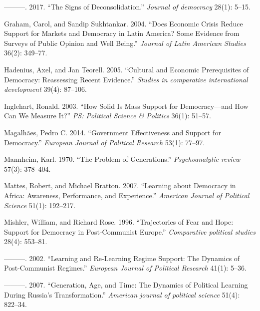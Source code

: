 \documentclass[12pt,english,a4paper,oneside]{article}
\newlength{\cslhangindent}
\newlength{\cslentryspacingunit} %
\newenvironment{CSLReferences}[2] %
 {%
  \setlength{\parindent}{0pt}
  \ifodd #1
  \let\oldpar\par
  \def\par{\hangindent=\cslhangindent\oldpar}
  \fi
  \setlength{\parskip}{#2\cslentryspacingunit}
 }%
 {}
\theoremstyle{definition}
\theoremstyle{definition}
\theoremstyle{definition}
\theoremstyle{definition}
\theoremstyle{remark}
\begin{document}
\begin{CSLReferences}{1}{0}
\leavevmode{}%
---------. 2017. {``The Signs of Deconsolidation.''} \emph{Journal of democracy} 28(1): 5--15.

\leavevmode{}%
Graham, Carol, and Sandip Sukhtankar. 2004. {``Does Economic Crisis Reduce Support for Markets and Democracy in Latin America? Some Evidence from Surveys of Public Opinion and Well Being.''} \emph{Journal of Latin American Studies} 36(2): 349--77.

\leavevmode{}%
Hadenius, Axel, and Jan Teorell. 2005. {``Cultural and Economic Prerequisites of Democracy: Reassessing Recent Evidence.''} \emph{Studies in comparative international development} 39(4): 87--106.

\leavevmode{}%
Inglehart, Ronald. 2003. {``How Solid Is Mass Support for Democracy---and How Can We Measure It?''} \emph{PS: Political Science \& Politics} 36(1): 51--57.

\leavevmode{}%
Magalhães, Pedro C. 2014. {``Government Effectiveness and Support for Democracy.''} \emph{European Journal of Political Research} 53(1): 77--97.

\leavevmode{}%
Mannheim, Karl. 1970. {``The Problem of Generations.''} \emph{Psychoanalytic review} 57(3): 378--404.

\leavevmode{}%
Mattes, Robert, and Michael Bratton. 2007. {``Learning about Democracy in Africa: Awareness, Performance, and Experience.''} \emph{American Journal of Political Science} 51(1): 192--217.

\leavevmode{}%
Mishler, William, and Richard Rose. 1996. {``Trajectories of Fear and Hope: Support for Democracy in Post-Communist Europe.''} \emph{Comparative political studies} 28(4): 553--81.

\leavevmode{}%
---------. 2002. {``Learning and Re-Learning Regime Support: The Dynamics of Post-Communist Regimes.''} \emph{European Journal of Political Research} 41(1): 5--36.

\leavevmode{}%
---------. 2007. {``Generation, Age, and Time: The Dynamics of Political Learning During Russia's Transformation.''} \emph{American journal of political science} 51(4): 822--34.


\end{CSLReferences}
\end{document}
